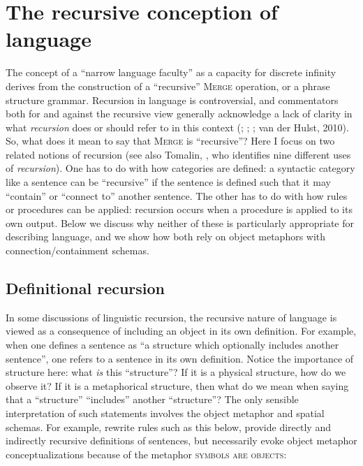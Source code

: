 \section{The recursive conception of language}

The concept of a “narrow language faculty” as a capacity for discrete infinity derives from the construction of a “recursive” \textsc{Merge} operation, or a phrase structure grammar. Recursion in language is controversial, and commentators both for and against the recursive view generally acknowledge a lack of clarity in what \textit{recursion} does or should refer to in this context (\citealt{Lobina2011}; \citealt{PullumScholz2010}; \citealt{Tomalin2011}; van der Hulst, 2010). So, what does it mean to say that \textsc{Merge} is “recursive”? Here I focus on two related notions of recursion (see also Tomalin, , who identifies nine different uses of \textit{recursion}). One has to do with how categories are defined: a syntactic category like a sentence can be “recursive” if the sentence is defined such that it may “contain” or “connect to” another sentence. The other has to do with how rules or procedures can be applied: recursion occurs when a procedure is applied to its own output. Below we discuss why neither of these is particularly appropriate for describing language, and we show how both rely on object metaphors with connection/containment schemas.

\subsection{Definitional recursion}

In some discussions of linguistic recursion, the recursive nature of language is viewed as a consequence of including an object in its own definition. For example, when one defines a sentence as “a structure which optionally includes another sentence”, one refers to a sentence in its own definition. Notice the importance of structure here: what \textit{is} this “structure”? If it is a physical structure, how do we observe it? If it is a metaphorical structure, then what do we mean when saying that a “structure” “includes” another “structure”? The only sensible interpretation of such statements involves the object metaphor and spatial schemas. For example, rewrite rules such as this below, provide directly and indirectly recursive definitions of sentences, but necessarily evoke object metaphor conceptualizations because of the metaphor \textsc{symbols} \textsc{are} \textsc{objects}:

